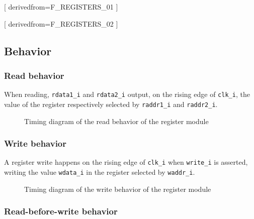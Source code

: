 [
  derivedfrom=F\_REGISTERS\_01
]

[
  derivedfrom=F\_REGISTERS\_02
]

\subsection{Behavior}

\subsubsection{Read behavior}

\begin{content}
  When reading, \texttt{rdata1\_i} and \texttt{rdata2\_i} output, on the rising edge of \texttt{clk\_i}, the value of the register respectively selected by \texttt{raddr1\_i} and \texttt{raddr2\_i}. 
\end{content}

\begin{figure}[H]
    \centering
    
    \caption{Timing diagram of the read behavior of the register module}
    \label{fig:regm-behavior-read}
\end{figure}

\subsubsection{Write behavior}

\begin{content}
A register write happens on the rising edge of \texttt{clk\_i} when \texttt{write\_i} is asserted, writing the value \texttt{wdata\_i} in the register selected by \texttt{waddr\_i}.
\end{content}

\begin{figure}[H]
    \centering
    
    \caption{Timing diagram of the write behavior of the register module}
    \label{fig:regm-behavior-write}
\end{figure}

\subsubsection{Read-before-write behavior}

